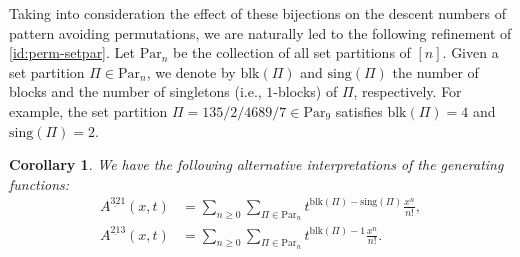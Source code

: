 \documentclass[11pt,reqno]{amsart}
\numberwithin{equation}{section}
\theoremstyle{plain}
\newtheorem{corollary}[theorem]{Corollary}
\theoremstyle{definition}
\def\blk{\mathrm{blk}}
\def\sing{\mathrm{sing}}
\def\Par{\mathrm{Par}}
\begin{document}
Taking into consideration the effect of these bijections on the descent numbers of pattern avoiding permutations, we are naturally led to the following refinement of \eqref{id:perm-setpar}. Let $\Par_n$ be the collection of all set partitions of $[n]$. Given a set partition $\Pi\in\Par_n$, we denote by $\blk(\Pi)$ and $\sing(\Pi)$ the number of blocks and the number of singletons (i.e., $1$-blocks) of $\Pi$, respectively. For example, the set partition $\Pi=135/2/4689/7\in\Par_9$ satisfies $\blk(\Pi)=4$ and $\sing(\Pi)=2$.

\begin{corollary}
We have the following alternative interpretations of the generating functions:
\begin{align}
\label{id:gf321 in setpar}
A^{\underline{32}1}(x,t) &= \sum_{n\ge 0}\sum_{\Pi\in\Par_n}t^{\blk(\Pi)-\sing(\Pi)}\frac{x^n}{n!},\\
A^{\underline{21}3}(x,t) &= \sum_{n\ge 0}\sum_{\Pi\in\Par_n}t^{\blk(\Pi)-1}\frac{x^n}{n!}.
\label{id:gf213 in setpar}
\end{align}
\end{corollary}
\end{document}
